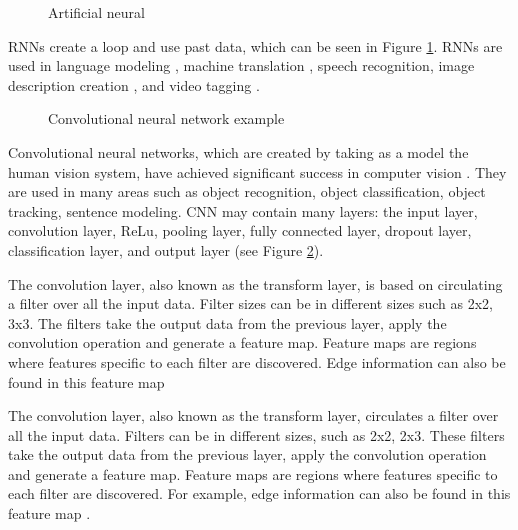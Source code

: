 \begin{figure}[htbp]
\centering
{}
\caption{Artificial neural \cite{quiza2009computational}}
\label{fig:MethodologyRecurrentNeuralNetwork}
\end{figure}

RNNs create a loop and use past data, which can be seen in Figure \ref{fig:MethodologyRecurrentNeuralNetwork}. RNNs are used in language modeling \cite{mikolov2011extensions}, machine translation \cite{cho2014learning}, speech recognition\cite{miao2015eesen}, image description creation \cite{mao2014deep}, and video tagging \cite{garg2021video}. 

\begin{figure}[htbp]
\centering
{}
\caption{Convolutional neural network example \cite{ferracuti2019business}}
\label{fig:MethodologyConvolutionalNeuralNetworkExample}
\end{figure}

Convolutional neural networks, which are created by taking as a model the human vision system, have achieved significant success in computer vision \cite{gu2018recent, bouvrie2006notes, lavin2016fast}. They are used in many areas such as object recognition, object classification, object tracking, sentence modeling. CNN may contain many layers: the input layer, convolution layer, ReLu, pooling layer, fully connected layer, dropout layer, classification layer, and output layer (see Figure \ref{fig:MethodologyConvolutionalNeuralNetworkExample}).

The convolution layer, also known as the transform layer, is based on circulating a filter over all the input data. Filter sizes can be in different sizes such as 2x2, 3x3. The filters take the output data from the previous layer, apply the convolution operation and generate a feature map. Feature maps are regions where features specific to each filter are discovered. Edge information can also be found in this feature map \cite{goodfellow2016deep}

The convolution layer, also known as the transform layer, circulates a filter over all the input data. Filters can be in different sizes, such as 2x2, 2x3. These filters take the output data from the previous layer, apply the convolution operation and generate a feature map. Feature maps are regions where features specific to each filter are discovered. For example, edge information can also be found in this feature map \cite{goodfellow2016deep}.


